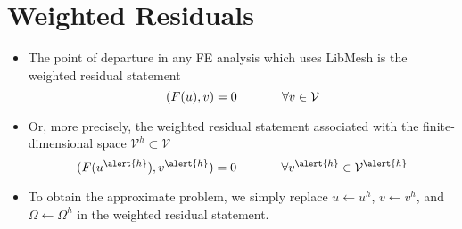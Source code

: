 \section{Weighted Residuals}


\begin{frame}[<+->]
  \begin{itemize}
  \item {The point of departure in any FE analysis which uses LibMesh is
    the weighted residual statement
    \begin{equation}
      \nonumber
      (F( u ), v) = 0 \hspace{.5in} \forall v \in \mathcal{V}
    \end{equation}
    }

  \item{ Or, more precisely, the weighted residual statement associated with the
    finite-dimensional space $\mathcal{V}^h \subset \mathcal{V}$
    \begin{equation}
      \nonumber
      (F( u^{\alert{h}} ), v^{\alert{h}}) = 0 \hspace{.5in} \forall v^{\alert{h}} \in \mathcal{V}^{\alert{h}}
  \end{equation}}

  \end{itemize}
\end{frame}





\begin{frame}%
  \begin{itemize}




  \item{To obtain the approximate problem, we simply
    replace $u \leftarrow u^h$, $v \leftarrow v^h$, and $\Omega \leftarrow \Omega^h$
    in the weighted residual
    statement.}
    
  \end{itemize}
\end{frame}
